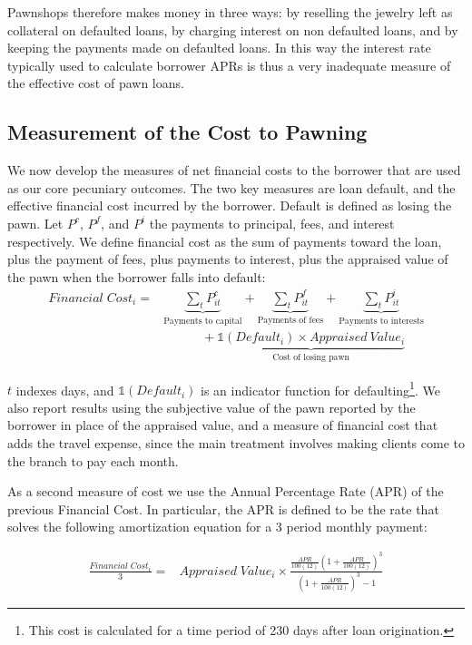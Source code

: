 \documentclass[oneside,11pt]{article}
\begin{document}
Pawnshops therefore makes money in three ways: by reselling the jewelry left as collateral on defaulted loans, by charging interest on non defaulted loans, and by keeping the payments made on defaulted loans. In this way the interest rate typically used to calculate borrower APRs is thus a very inadequate measure of the effective cost of pawn loans.

    
\subsection{Measurement of the Cost to Pawning} \label{costs}
    
We now develop the measures of net financial costs to the borrower that are used as our core pecuniary outcomes.  The two key measures are loan default, and the effective financial cost incurred by the borrower. Default is defined as losing the pawn. Let $P^c$, $P^f$, and $P^i$ the payments to principal, fees, and interest respectively. We define financial cost as the sum of payments toward the loan, plus the payment of fees, plus payments to interest, plus the appraised value of the pawn when the borrower falls into default: 
\begin{align*}
    Financial \; Cost_i =& \underbrace{\sum_t P^c_{it}}_{\text{Payments to capital}} + \underbrace{\sum_t P^f_{it}}_{\text{Payments of fees}}  +\underbrace{\sum_t P^i_{it}}_{\text{Payments to interests}} \\
    &\quad\qquad + \underbrace{\mathds{1}(Default_i) \times Appraised \: Value_i}_{\text{Cost of losing pawn}}
\end{align*}

\noindent $t$ indexes days, and $\mathds{1}(Default_i)$ is an indicator function for defaulting\footnote{This cost is calculated for a time period of 230 days after loan origination.}. We also report results using the subjective value of the pawn reported by the borrower in place of the appraised value, and a measure of financial cost that adds the travel expense, since the main treatment involves making clients come to the branch to pay each month.

As a second measure of cost we use the Annual Percentage Rate (APR) of the previous Financial Cost. In particular, the APR is defined to be the rate that solves the following amortization equation for a 3 period monthly payment:


\begin{align*}
    \frac{Financial\;Cost_i}{3} =& Appraised\; Value_i \times \frac{\frac{APR}{100(12)}\left(1+\frac{APR}{100(12)}\right)^3}{\left(1+\frac{APR}{100(12)}\right)^3-1}     
\end{align*}
\end{document}
